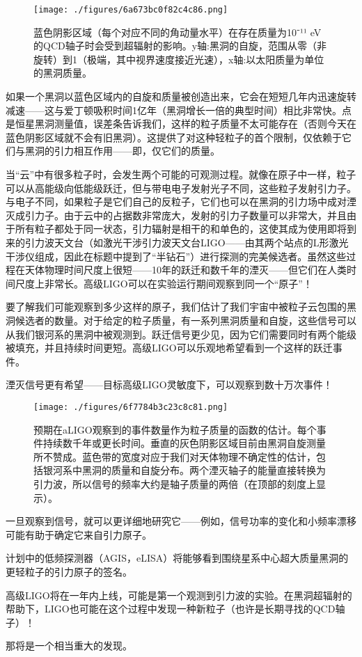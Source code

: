 \begin{figure}[ht]
\centering
\texttt{[image: ./figures/6a673bc0f82c4c86.png]}
\caption{蓝色阴影区域（每个对应不同的角动量水平）在存在质量为10⁻¹¹ eV的QCD轴子时会受到超辐射的影响。y轴:黑洞的自旋，范围从零（非旋转）到1（极端，其中视界速度接近光速），x轴:以太阳质量为单位的黑洞质量。} \label{fig_GAtom_3}
\end{figure}

如果一个黑洞以蓝色区域内的自旋和质量被创造出来，它会在短短几年内迅速旋转减速——这与爱丁顿吸积时间1亿年（黑洞增长一倍的典型时间）相比非常快。点是恒星黑洞测量值，误差条告诉我们，这样的粒子质量不太可能存在（否则今天在蓝色阴影区域就不会有旧黑洞）。这提供了对这种轻粒子的首个限制，仅依赖于它们与黑洞的引力相互作用——即，仅它们的质量。

当“云”中有很多粒子时，会发生两个可能的可观测过程。就像在原子中一样，粒子可以从高能级向低能级跃迁，但与带电电子发射光子不同，这些粒子发射引力子。与电子不同，如果粒子是它们自己的反粒子，它们也可以在黑洞的引力场中成对湮灭成引力子。由于云中的占据数非常庞大，发射的引力子数量可以非常大，并且由于所有粒子都处于同一状态，引力辐射是相干的和单色的，这使其成为使用即将到来的引力波天文台（如激光干涉引力波天文台LIGO——由其两个站点的L形激光干涉仪组成，因此在标题中提到了“半钻石”）进行探测的完美候选者。虽然这些过程在天体物理时间尺度上很短——10年的跃迁和数千年的湮灭——但它们在人类时间尺度上非常长。高级LIGO可以在实验运行期间观察到同一个“原子”！

要了解我们可能观察到多少这样的原子，我们估计了我们宇宙中被粒子云包围的黑洞候选者的数量。对于给定的粒子质量，有一系列黑洞质量和自旋，这些信号可以从我们银河系的黑洞中被观测到。跃迁信号更少见，因为它们需要同时有两个能级被填充，并且持续时间更短。高级LIGO可以乐观地希望看到一个这样的跃迁事件。

湮灭信号更有希望——目标高级LIGO灵敏度下，可以观察到数十万次事件！

\begin{figure}[ht]
\centering
\texttt{[image: ./figures/6f7784b3c23c8c81.png]}
\caption{预期在aLIGO观察到的事件数量作为粒子质量的函数的估计。每个事件持续数千年或更长时间。垂直的灰色阴影区域目前由黑洞自旋测量所不赞成。蓝色带的宽度对应于我们对天体物理不确定性的估计，包括银河系中黑洞的质量和自旋分布。两个湮灭轴子的能量直接转换为引力波，所以信号的频率大约是轴子质量的两倍（在顶部的刻度上显示）。} \label{fig_GAtom_4}
\end{figure}


一旦观察到信号，就可以更详细地研究它——例如，信号功率的变化和小频率漂移可能有助于确定它来自引力原子。

计划中的低频探测器（AGIS，eLISA）将能够看到围绕星系中心超大质量黑洞的更轻粒子的引力原子的签名。

高级LIGO将在一年内上线，可能是第一个观测到引力波的实验。在黑洞超辐射的帮助下，LIGO也可能在这个过程中发现一种新粒子（也许是长期寻找的QCD轴子）！

那将是一个相当重大的发现。





